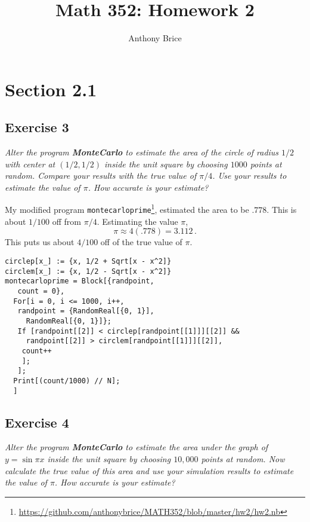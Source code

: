 \documentclass{tufte-handout}
\title{Math 352: Homework 2}
\author{Anthony Brice}
\begin{document}
\maketitle
\section{Section 2.1}
\subsection{Exercise 3}
\begin{description}
\item \textit{Alter the program \textbf{MonteCarlo} to estimate the
    area of the circle of radius $1/2$ with center at $(1/2,1/2)$
    inside the unit square by choosing $1000$ points at random. Compare
    your results with the true value of $\pi/4$. Use your results to
    estimate the value of $\pi$. How accurate is your estimate?}
\end{description}

My modified
program \lstinline$montecarloprime$\footnote{\url{https://github.com/anthonybrice/MATH352/blob/master/hw2/hw2.nb}},
estimated the area to be $.778$. This is about $1/100$ off from
$\pi/4$. Estimating the value $\pi$, \[\pi \approx 4(.778) = 3.112
\,.\]
This puts us about $4/100$ off of the true value of $\pi$.

\begin{lstlisting}
circlep[x_] := {x, 1/2 + Sqrt[x - x^2]}
circlem[x_] := {x, 1/2 - Sqrt[x - x^2]}
montecarloprime = Block[{randpoint,
   count = 0},
  For[i = 0, i <= 1000, i++,
   randpoint = {RandomReal[{0, 1}],
     RandomReal[{0, 1}]};
   If [randpoint[[2]] < circlep[randpoint[[1]]][[2]] && 
     randpoint[[2]] > circlem[randpoint[[1]]][[2]],
    count++
    ];
   ];
  Print[(count/1000) // N];
  ]
\end{lstlisting}

\subsection{Exercise 4}
\begin{description}
\item \textit{Alter the program \textbf{MonteCarlo} to estimate the
    area under the graph of $y = \sin{\pi x}$ inside the unit square by
    choosing $10,000$ points at random. Now calculate the true value
    of this area and use your simulation results to estimate the value
    of $\pi$. How accurate is your estimate?}
\end{description}
\end{document}
